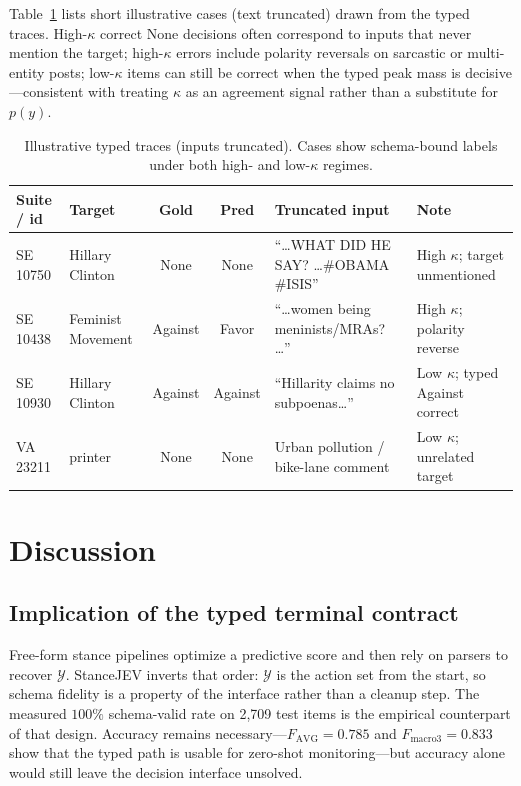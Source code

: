\documentclass[10pt]{article}
\theoremstyle{definition}
\begin{document}
Table~\ref{tab:cases} lists short illustrative cases (text truncated) drawn from the typed traces.
High-$\kappa$ correct None decisions often correspond to inputs that never mention the target; high-$\kappa$
errors include polarity reversals on sarcastic or multi-entity posts; low-$\kappa$ items can still be correct
when the typed peak mass is decisive---consistent with treating $\kappa$ as an agreement signal rather than a
substitute for $p(y)$.

\begin{table}[H]
\centering
\scriptsize
\begin{tabular}{p{1.6cm}p{1.5cm}ccp{4.6cm}p{3.4cm}}
\toprule
Suite / id & Target & Gold & Pred & Truncated input & Note \\
\midrule
SE 10750 & Hillary Clinton & None & None & ``\ldots WHAT DID HE SAY? \ldots \#OBAMA \#ISIS'' & High $\kappa$; target unmentioned \\
SE 10438 & Feminist Movement & Against & Favor & ``\ldots women being meninists/MRAs? \ldots'' & High $\kappa$; polarity reverse \\
SE 10930 & Hillary Clinton & Against & Against & ``Hillarity claims no subpoenas\ldots'' & Low $\kappa$; typed Against correct \\
VA 23211 & printer & None & None & Urban pollution / bike-lane comment & Low $\kappa$; unrelated target \\
\bottomrule
\end{tabular}
\caption{Illustrative typed traces (inputs truncated).
Cases show schema-bound labels under both high- and low-$\kappa$ regimes.}
\label{tab:cases}
\end{table}

\section{Discussion}
\label{sec:discussion}

\subsection{Implication of the typed terminal contract}
Free-form stance pipelines optimize a predictive score and then rely on parsers to recover $\mathcal{Y}$.
StanceJEV inverts that order: $\mathcal{Y}$ is the action set from the start, so schema fidelity is a property
of the interface rather than a cleanup step.
The measured $100\%$ schema-valid rate on 2{,}709 test items is the empirical counterpart of that design.
Accuracy remains necessary---$F_{\mathrm{AVG}}{=}0.785$ and $F_{\mathrm{macro3}}{=}0.833$ show that the typed
path is usable for zero-shot monitoring---but accuracy alone would still leave the decision interface
unsolved.
\end{document}

